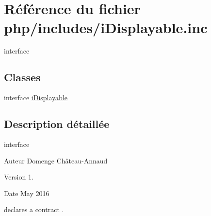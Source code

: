 \hypertarget{iDisplayable_8inc}{}\section{Référence du fichier php/includes/i\+Displayable.inc}
\label{iDisplayable_8inc}


interface  


\subsection*{Classes}
\begin{DoxyCompactItemize}
\item 
interface \hyperlink{interfaceiDisplayable}{i\+Displayable}
\end{DoxyCompactItemize}


\subsection{Description détaillée}
interface 

\begin{DoxyAuthor}{Auteur}
Domenge Château-\/\+Annaud 
\end{DoxyAuthor}
\begin{DoxyVersion}{Version}
1. 
\end{DoxyVersion}
\begin{DoxyDate}{Date}
May 2016
\end{DoxyDate}
declares a contract . 